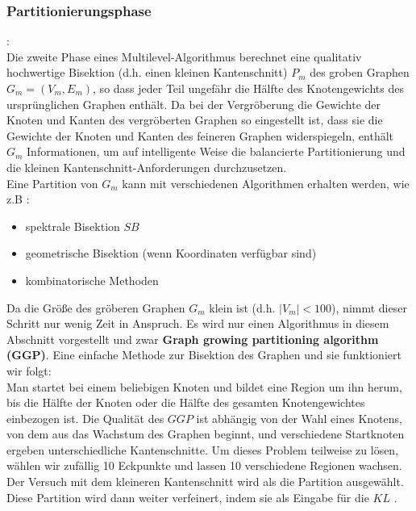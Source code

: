 \documentclass[runningheads]{llncs}
\begin{document}
\subsubsection{Partitionierungsphase}:\\
Die zweite Phase eines Multilevel-Algorithmus berechnet
eine qualitativ hochwertige Bisektion (d.h. einen kleinen Kantenschnitt) $P_m$ des groben Graphen $G_m = (V_m, E_m)$,
so dass jeder Teil ungefähr die Hälfte des Knotengewichts des ursprünglichen Graphen enthält. Da bei der Vergröberung die Gewichte der Knoten und Kanten des vergröberten Graphen so eingestellt ist, dass sie die Gewichte der Knoten und Kanten des feineren Graphen widerspiegeln, enthält $G_m$ Informationen, um auf intelligente Weise die balancierte Partitionierung und die kleinen Kantenschnitt-Anforderungen durchzusetzen.\\
Eine Partition von $G_m$ kann mit verschiedenen Algorithmen erhalten werden, wie z.B \cite{karypis1998fast}:
\begin{itemize}
	\item spektrale Bisektion $SB$
	\item geometrische Bisektion (wenn Koordinaten verfügbar sind)
	\item kombinatorische Methoden
\end{itemize}
Da die Größe des
gröberen Graphen $G_m$ klein ist (d.h. $\lvert V_m \lvert < 100$), nimmt dieser Schritt nur wenig Zeit in Anspruch.
Es wird nur einen Algorithmus in diesem Abschnitt vorgestellt und zwar \textbf{Graph growing partitioning algorithm (GGP)}. Eine einfache Methode zur Bisektion des Graphen und sie funktioniert wir folgt:\\
Man startet bei einem beliebigen Knoten und bildet eine Region um ihn herum, bis die Hälfte der Knoten oder die Hälfte des gesamten Knotengewichtes einbezogen ist. Die Qualität des $GGP$ ist abhängig von der Wahl eines Knotens, von dem aus das Wachstum des Graphen beginnt, und verschiedene Startknoten ergeben unterschiedliche Kantenschnitte.  
 Um dieses Problem teilweise zu lösen, wählen wir zufällig 10 Eckpunkte
und lassen 10 verschiedene Regionen wachsen. Der Versuch mit dem kleineren Kantenschnitt wird als
die Partition ausgewählt. Diese Partition wird dann weiter verfeinert, indem sie als Eingabe für die $KL$ \cite{karypis1998fast}.
\end{document}
